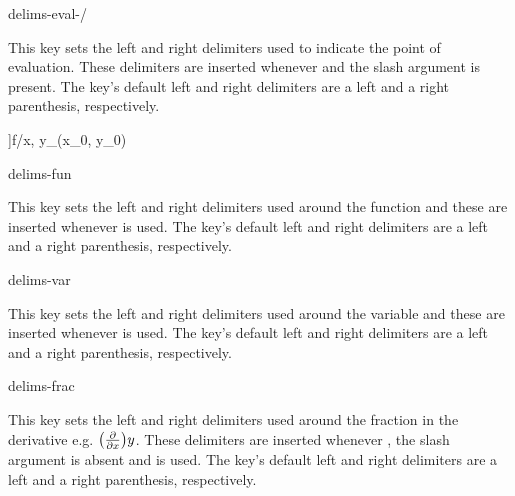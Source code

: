 \clearpage

\begin{option}{delims-eval-/}
	\begin{values}[default = .~\cs{rvert}]
	\end{values}
	This key sets the left and right delimiters used to indicate the point of evaluation. These delimiters are inserted whenever  and the slash argument is present. The key's default left and right delimiters are a left and a right parenthesis, respectively.
	\begin{example}
		\pdv[delims-eval-/=[]]{f}/{x, y}_{(x_0, y_0)}
	\end{example}
\end{option}

\begin{option}{delims-fun}
	\begin{values}[default = (~)]
		\meta{right delimiter}
	\end{values}
	This key sets the left and right delimiters used around the function and these are inserted whenever  is used. The key's default left and right delimiters are a left and a right parenthesis, respectively.
	\begin{example}
		\pdv[delims-fun=\langle\rangle, fun]{f}{x, y}
	\end{example}
\end{option}

\begin{option}{delims-var}
	\begin{values}[default = (~)]
	\end{values}
	This key sets the left and right delimiters used around the variable and these are inserted whenever  is used. The key's default left and right delimiters are a left and a right parenthesis, respectively.
	\begin{example}
		\pdv[delims-var=\{\}, var]{f}{x, y}
	\end{example}
\end{option}

\begin{option}{delims-frac}
	\begin{values}[default = (~)]
	\end{values}
	This key sets the left and right delimiters used around the fraction in the derivative e.g. $\pdv*[frac=true]{y}{x}$. These delimiters are inserted whenever , the slash argument is absent and  is used. The key's default left and right delimiters are a left and a right parenthesis, respectively.
	\begin{example}
		\pdv[delims-frac=||, frac]{f}{x, y}
	\end{example}
\end{option}

